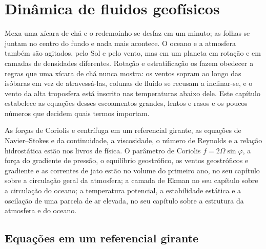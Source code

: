 \chapter{Dinâmica de fluidos geofísicos}\label{ch:b3:gfd-foundations}

Mexa uma xícara de chá e o redemoinho se desfaz em um minuto; as folhas se juntam no
centro do fundo e nada mais acontece. O oceano e a atmosfera
também são agitados, pelo Sol e pelo vento, mas em um planeta em rotação e em
camadas de densidades diferentes. Rotação e estratificação os fazem obedecer a
regras que uma xícara de chá nunca mostra: os ventos sopram ao longo das isóbaras em vez de
atravessá-las, colunas de fluido se recusam a inclinar-se, e o vento da alta
troposfera está inscrito nas temperaturas abaixo dele. Este capítulo estabelece
as equações desses escoamentos grandes, lentos e rasos e os poucos números que
decidem quais termos importam.

\begin{recall}
As forças de Coriolis e centrífuga em um referencial girante, as equações de Navier--Stokes
e da continuidade, a viscosidade, o número de Reynolds e a relação hidrostática
estão nos livros de física. O parâmetro de Coriolis $f = 2\Omega
\sin\varphi$, a força do gradiente de pressão, o equilíbrio geostrófico, os
ventos geostróficos e gradiente e as correntes de jato estão no volume do primeiro
ano, no seu capítulo sobre a circulação geral da atmosfera; a
camada de Ekman no seu capítulo sobre a circulação do oceano; a temperatura potencial,
a estabilidade estática e a oscilação de uma parcela de ar elevada, no seu
capítulo sobre a estrutura da atmosfera e do oceano.
\end{recall}

\section{Equações em um referencial girante}\label{sec:b3:gfd-foundations:equations}

